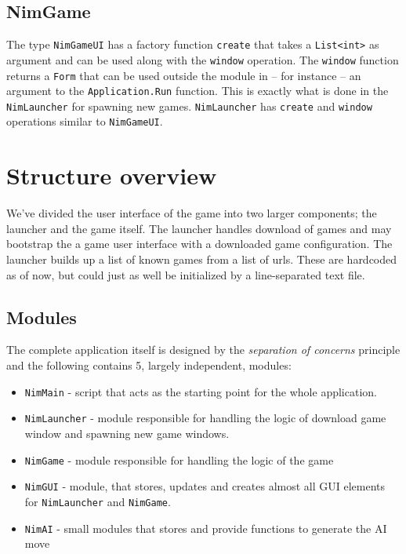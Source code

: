 \documentclass[10pt]{scrartcl}
\begin{document}
\subsection{NimGame}
The type \texttt{NimGameUI} has a factory function \texttt{create} that takes a \texttt{List<int>} as argument and can be used along with the \texttt{window} operation. The \texttt{window} function returns a \texttt{Form} that can be used outside the module in -- for instance -- an argument to the \texttt{Application.Run} function. This is exactly what is done in the \texttt{NimLauncher} for spawning new games. \texttt{NimLauncher} has \texttt{create} and  \texttt{window} operations similar to \texttt{NimGameUI}.


\section{Structure overview}
We've divided the user interface of the game into two larger components; the launcher and the game itself. The launcher handles download of games and may bootstrap the a game user interface with a downloaded game configuration. The launcher builds up a list of known games from a list of urls. These are hardcoded as of now, but could just as well be initialized by a line-separated text file.
\subsection{Modules}
The complete application itself is designed by the \emph{separation of concerns} principle and the following contains 5, largely independent, modules:
\begin{itemize}
  \item \texttt{NimMain} - script that acts as the starting point for the whole application.
  \item \texttt{NimLauncher} - module responsible for handling the logic of download game window and spawning new game windows.
  \item \texttt{NimGame} - module responsible for handling the logic of the game
  \item \texttt{NimGUI} - module, that stores, updates and creates almost all GUI elements for \texttt{NimLauncher} and \texttt{NimGame}.
  \item \texttt{NimAI} - small modules that stores and provide functions to generate the AI move
\end{itemize}
\end{document}

